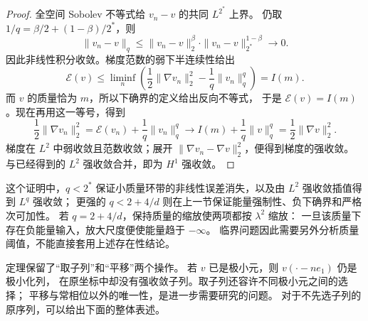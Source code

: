 \begin{proof}
全空间 Sobolev 不等式给 \(v_n-v\) 的共同 \(L^{2^*}\) 上界。
仍取 \(1/q=\beta/2+(1-\beta)/2^*\)，则
\[
 \|v_n-v\|_q
 \le\|v_n-v\|_2^\beta\cdot\|v_n-v\|_{2^*}^{1-\beta}
 \longrightarrow0.
\]
因此非线性积分收敛。梯度范数的弱下半连续性给出
\[
 \mathcal E(v)
 \le\liminf_n\left(\frac12\|\nabla v_n\|_2^2
                         -\frac1q\|v_n\|_q^q\right)
 =I(m).
\]
而 \(v\) 的质量恰为 \(m\)，所以下确界的定义给出反向不等式，
于是 \(\mathcal E(v)=I(m)\)。现在再用这一等号，得到
\[
 \frac12\|\nabla v_n\|_2^2
 =\mathcal E(v_n)+\frac1q\|v_n\|_q^q
 \longrightarrow I(m)+\frac1q\|v\|_q^q
 =\frac12\|\nabla v\|_2^2.
\]
梯度在 \(L^2\) 中弱收敛且范数收敛；展开
\(\|\nabla v_n-\nabla v\|_2^2\)，便得到梯度的强收敛。
与已经得到的 \(L^2\) 强收敛合并，即为 \(H^1\) 强收敛。
\end{proof}

这个证明中，\(q<2^*\) 保证小质量环带的非线性误差消失，以及由 \(L^2\) 强收敛插值得到 \(L^q\) 强收敛；
更强的 \(q<2+4/d\) 则在上一节保证能量强制性、负下确界和严格次可加性。
若 \(q=2+4/d\)，保持质量的缩放使两项都按 \(\lambda^2\) 缩放：
一旦该质量下存在负能量输入，放大尺度便使能量趋于 \(-\infty\)。
临界问题因此需要另外分析质量阈值，不能直接套用上述存在性结论。

\ProseParagraphBreak
定理保留了“取子列”和“平移”两个操作。
若 \(v\) 已是极小元，则 \(v(\cdot-ne_1)\) 仍是极小化列，
在原坐标中却没有强收敛子列。取子列还容许不同极小元之间的选择；
平移与常相位以外的唯一性，是进一步需要研究的问题。
对于不先选子列的原序列，可以给出下面的整体表述。

